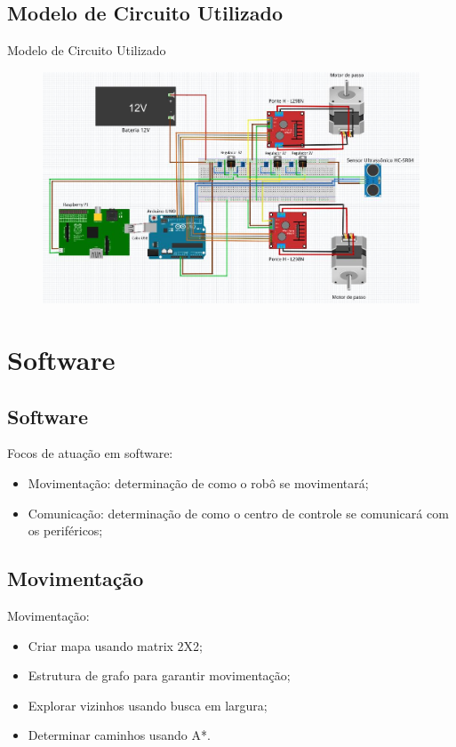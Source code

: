 \documentclass{beamer}
\begin{document}
\subsection{Modelo de Circuito Utilizado}
\begin{frame}
  Modelo de Circuito Utilizado
    \begin{figure}
    \centering
    \includegraphics[width=0.9\linewidth]{eletronica_3}
  \end{figure}
\end{frame}


\section{Software}
\subsection{Software}
\begin{frame}
  \centering
  Focos de atuação em software:
    \begin{itemize}
    \centering
        \item Movimentação: determinação de como o robô se movimentará;
        \centering
        \item Comunicação: determinação de como o centro de controle se comunicará com os periféricos;
    \end{itemize}
\end{frame}

\subsection{Movimentação}
\begin{frame}
  Movimentação:
    \begin{itemize}
        \item Criar mapa usando matrix 2X2;
        \item Estrutura de grafo para garantir movimentação;
        \item Explorar vizinhos usando busca em largura;
        \item Determinar caminhos usando A*.
    \end{itemize}
\end{frame}
\end{document}
